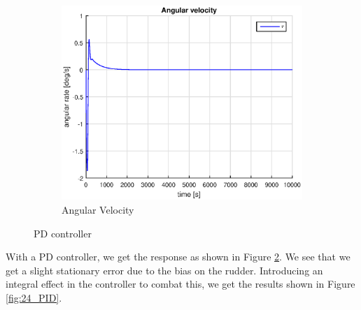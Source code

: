 \begin{figure}[h]
    \begin{subfigure}[b]{0.45\textwidth}
        \includegraphics[width=\textwidth]{plots/2_4_r_PD.eps}
        \caption{Angular Velocity}
        \label{fig:24_r_pd}
    \end{subfigure}
    \caption{PD controller}\label{fig:24_PD}
\end{figure}

With a PD controller, we get the response as shown in Figure \ref{fig:24_PD}. We see that we get a slight stationary error due to the bias on the rudder. Introducing an integral effect in the controller to combat this, we get the results shown in Figure \ref{fig:24_PID}.

